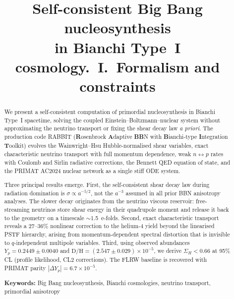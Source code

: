 \documentclass[a4paper,11pt]{article}
\title{\textbf{Self-consistent Big Bang nucleosynthesis\\[4pt]
in Bianchi Type~I cosmology.~I.~Formalism and constraints}}
\author{}
\date{}
\newcommand{\SigH}{\Sigma_H}
\newcommand{\Yp}{Y_p}
\begin{document}
\maketitle

\begin{abstract}
\noindent
We present a self-consistent computation of primordial nucleosynthesis in Bianchi Type~I spacetime, solving the coupled Einstein--Boltzmann--nuclear system without approximating the neutrino transport or fixing the shear decay law \textit{a priori}.  The production code RABBIT (\textbf{R}osenbrock \textbf{A}daptive \textbf{BB}N with \textbf{B}ianchi-type \textbf{I}ntegration \textbf{T}oolkit) evolves the Wainwright--Hsu Hubble-normalised shear variables, exact characteristic neutrino transport with full momentum dependence, weak $n\leftrightarrow p$ rates with Coulomb and Sirlin radiative corrections, the Bennett QED equation of state, and the PRIMAT AC2024 nuclear network as a single stiff ODE system.

Three principal results emerge.  First, the self-consistent shear decay law during radiation domination is $\sigma \propto a^{-5/2}$, not the $a^{-3}$ assumed in all prior BBN anisotropy analyses.  The slower decay originates from the neutrino viscous reservoir: free-streaming neutrinos store shear energy in their quadrupole moment and release it back to the geometry on a timescale $\sim$1.5~e-folds.  Second, exact characteristic transport reveals a 27--36\% nonlinear correction to the helium-4 yield beyond the linearised PSTF hierarchy, arising from momentum-dependent spectral distortion that is invisible to $q$-independent multipole variables.  Third, using observed abundances $\Yp = 0.2449 \pm 0.0040$ and $\mathrm{D/H} = (2.547 \pm 0.029)\times 10^{-5}$, we derive $\SigH < 0.66$ at 95\% CL (profile likelihood, CL2 corrections).  The FLRW baseline is recovered with PRIMAT parity $|\Delta\Yp| = 6.7\times 10^{-5}$.

\vspace{6pt}
\noindent\textbf{Keywords:} Big Bang nucleosynthesis, Bianchi cosmologies, neutrino transport, primordial anisotropy
\end{abstract}

\newpage
\tableofcontents
\newpage

\end{document}
